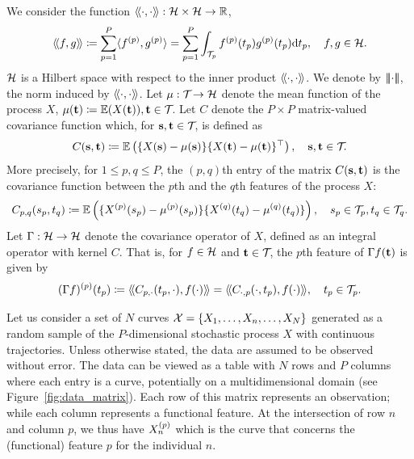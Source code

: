 We consider the function $\langle\!\langle\cdot, \cdot\rangle\!\rangle : \mathcal{H} \times \mathcal{H} \rightarrow \mathbb{R}$,
\begin{equation}\label{eq:innerprodH}
    \langle\!\langle f, g\rangle\!\rangle \coloneqq \sum_{p=1}^{P} \langle f^{(p)}, g^{(p)}\rangle = \sum_{p=1}^{P}\int_{\mathcal{T}_{p}} f^{(p)}(t_p)g^{(p)}(t_p) {\rm d} t_p, \quad f, g \in \mathcal{H}.
\end{equation}
$\mathcal{H}$ is a Hilbert space with respect to the inner product $\langle\!\langle\cdot, \cdot\rangle\!\rangle$\citep{happMultivariateFunctionalPrincipal2018a}. We denote by $\left|\!\left|\!\left|\cdot\right|\!\right|\!\right|$, the norm induced by $\langle\!\langle\cdot, \cdot\rangle\!\rangle$. Let $\mu : \mathcal{T}_{} \rightarrow \mathcal{H}$ denote the mean function of the process $X$, $\mu(\mathbf{t}) \coloneqq \mathbb{E}(X(\mathbf{t})), \mathbf{t} \in \mathcal{T}_{}$. Let $C$ denote the $P \times P$ matrix-valued covariance function which, for $\mathbf{s}, \mathbf{t} \in \mathcal{T}_{}$, is defined as
\begin{equation}\label{eq:covariance_function}
    C(\mathbf{s}, \mathbf{t}) \coloneqq \mathbb{E}\left(\{X(\mathbf{s}) - \mu(\mathbf{s})\}\{X(\mathbf{t}) - \mu(\mathbf{t})\}^{\top}\right), \quad \mathbf{s}, \mathbf{t} \in \mathcal{T}_{}.
\end{equation}
More precisely, for $1 \leq p, q \leq P$, the $(p, q)$th entry of the matrix $C(\mathbf{s}, \mathbf{t})$ is the covariance function between the $p$th and the $q$th features of the process $X$:
\begin{equation}\label{eq:covariance_function_components}
    C_{p, q}(s_p, t_q) \coloneqq \mathbb{E}\left(\{X^{(p)}(s_p) - \mu^{(p)}(s_p)\}\{X^{(q)}(t_q) - \mu^{(q)}(t_q)\}\right), \quad s_p \in \mathcal{T}_{p}, t_q \in \mathcal{T}_{q}.
\end{equation}
Let $\Gamma : \mathcal{H} \rightarrow \mathcal{H}$ denote the covariance operator of $X$, defined as an integral operator with kernel $C$. That is, for $f \in \mathcal{H}$ and $\mathbf{t} \in \mathcal{T}_{}$, the $p$th feature of $\Gamma f(\mathbf{t})$ is given by
\begin{equation}\label{eq:covariance_operator_components}
    (\Gamma f)^{(p)}(t_p) \coloneqq \langle\!\langle C_{p, \cdot}(t_p, \cdot), f(\cdot)\rangle\!\rangle = \langle\!\langle C_{\cdot, p}(\cdot, t_p), f(\cdot)\rangle\!\rangle, \quad t_p \in \mathcal{T}_{p}.
\end{equation}

Let us consider a set of $N$ curves $\mathcal{X} = \{X_1, \ldots, X_n, \ldots, X_N\}$ generated as a random sample of the $P$-dimensional stochastic process $X$ with continuous trajectories. Unless otherwise stated, the data are assumed to be observed without error. The data can be viewed as a table with $N$ rows and $P$ columns where each entry is a curve, potentially on a multidimensional domain (see Figure~\ref{fig:data_matrix}). Each row of this matrix represents an observation; while each column represents a functional feature. At the intersection of row $n$ and column $p$, we thus have $X_n^{(p)}$ which is the curve that concerns the (functional) feature $p$ for the individual $n$.

